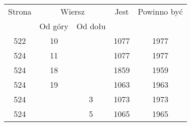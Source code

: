 \documentclass[a4paper,11pt]{article}
\begin{document}
\begin{center}
  \newpage

  \begin{tabular}{|c|c|c|c|c|}
    \hline
    Strona & \multicolumn{2}{c|}{Wiersz} & Jest
                              & Powinno być \\ \cline{2-3}
    & Od góry & Od dołu & & \\
    \hline
    522 & 10 & & 1077 & 1977 \\
    524 & 11 & & 1077 & 1977 \\
    524 & 18 & & 1859 & 1959 \\
    524 & 19 & & 1063 & 1963 \\
    524 & & \hphantom{0}3 & 1073 & 1973 \\
    524 & & \hphantom{0}5 & 1065 & 1965 \\
    \hline
  \end{tabular}

\end{center}

\vspace{\spaceTwo}
\end{document}
